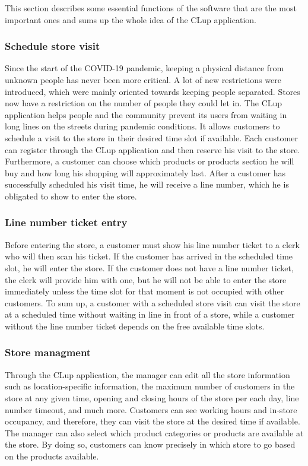 This section describes some essential functions of the software that are the most important ones and sums up the whole idea of the CLup application.

\subsubsection {Schedule store visit}
Since the start of the COVID-19 pandemic, keeping a physical distance from unknown people has never been more critical.
A lot of new restrictions were introduced, which were mainly oriented towards keeping people separated.
Stores now have a restriction on the number of people they could let in.
The CLup application helps people and the community prevent its users from waiting in long lines on the streets during pandemic conditions.
It allows customers to schedule a visit to the store in their desired time slot if available.
Each customer can register through the CLup application and then reserve his visit to the store.
Furthermore, a customer can choose which products or products section he will buy and how long his shopping will approximately last.
After a customer has successfully scheduled his visit time, he will receive a line number, which he is obligated to show to enter the store.

\subsubsection {Line number ticket entry}
Before entering the store, a customer must show his line number ticket to a clerk who will then scan his ticket.
If the customer has arrived in the scheduled time slot, he will enter the store.
If the customer does not have a line number ticket, the clerk will provide him with one, but he will not be able to enter the store immediately unless the time slot for that moment is not occupied with other customers.
To sum up, a customer with a scheduled store visit can visit the store at a scheduled time without waiting in line in front of a store, while a customer without the line number ticket depends on the free available time slots.

\subsubsection {Store managment}
Through the CLup application, the manager can edit all the store information such as location-specific information, the maximum number of customers in the store at any given time, opening and closing hours of the store per each day, line number timeout, and much more.
Customers can see working hours and in-store occupancy, and therefore, they can visit the store at the desired time if available.
The manager can also select which product categories or products are available at the store. By doing so, customers can know precisely in which store to go based on the products available.

